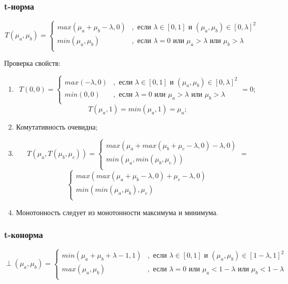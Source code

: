 \documentclass[12pt]{article}
\begin{document}
\subsubsection{t-норма}

$$
T(\mu_a, \mu_b) =
\begin{cases}
max(\mu_a+\mu_b-\lambda, 0) &, \text{ если }\lambda\in[0, 1] \text{ и }(\mu_a, \mu_b)\in[0,\lambda]^2\\
min(\mu_a, \mu_b) &, \text{ если } \lambda=0 \text{ или }\mu_a>\lambda \text{ или } \mu_b>\lambda\\
\end{cases}
$$

\par Проверка свойств:
\begin{enumerate}
    \item $$ 
      T(0, 0) =
      \begin{cases}
         max(-\lambda, 0) &, \text{ если }\lambda\in[0, 1] \text{ и }(\mu_a, \mu_b)\in[0,\lambda]^2\\
         min(0, 0) &, \text{ если } \lambda=0 \text{ или }\mu_a>\lambda \text{ или } \mu_b>\lambda\\ 
      \end{cases} = 0;
      $$
      $$
      T(\mu_a, 1) = min(\mu_a, 1) = \mu_a;
      $$
  \item Комутативность очевидна;
  \item $$ 
      T(\mu_a, T(\mu_b, \mu_c)) = 
      \begin{cases}
         max(\mu_a+max(\mu_b+\mu_c-\lambda, 0)-\lambda, 0)\\
         min(\mu_a, min(\mu_b, \mu_c)) \\ 
      \end{cases} = 
  	$$
  	$$
      \begin{cases}
         max(max(\mu_a+\mu_b-\lambda, 0)+\mu_c-\lambda, 0) \\
         min(min(\mu_a, \mu_b), \mu_c) \\ 
      \end{cases}
      $$
  \item Монотонность следует из монотонности максимума и минимума.
\end{enumerate}

\subsubsection{t-конорма}

$$
   \perp(\mu_a, \mu_b) =
   \begin{cases}
      min(\mu_a+\mu_b+\lambda-1, 1) &, \text{ если }\lambda\in[0, 1] \text{ и }(\mu_a, \mu_b)\in[1-\lambda, 1]^2\\
      max(\mu_a, \mu_b) &, \text{ если } \lambda=0 \text{ или }\mu_a<1-\lambda \text{ или } \mu_b<1-\lambda\\
   \end{cases}
$$
\end{document}
